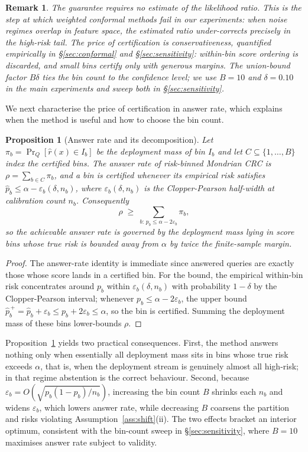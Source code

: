 \documentclass[11pt]{article}
\newtheorem{proposition}{Proposition}
\newtheorem{remark}{Remark}
\begin{document}
\begin{remark}
The guarantee requires no estimate of the likelihood ratio. This is the
step at which weighted conformal methods fail in our experiments: when
noise regimes overlap in feature space, the estimated ratio
under-corrects precisely in the high-risk tail. The price of
certification is conservativeness, quantified empirically in
\S\ref{sec:conformal} and \S\ref{sec:sensitivity}: within-bin score
ordering is discarded, and small bins certify only with generous
margins. The union-bound factor $B\delta$ ties the bin count to the
confidence level; we use $B = 10$ and $\delta = 0.10$ in the main
experiments and sweep both in \S\ref{sec:sensitivity}.
\end{remark}

We next characterise the price of certification in answer rate, which
explains when the method is useful and how to choose the bin count.

\begin{proposition}[Answer rate and its decomposition]\label{prop:eff}
Let $\pi_b = \Pr_Q[\hat r(x) \in I_b]$ be the deployment mass of bin
$I_b$ and let $C \subseteq \{1, \dots, B\}$ index the certified bins.
The answer rate of risk-binned Mondrian CRC is
$\rho = \sum_{b \in C} \pi_b$, and a bin is certified whenever its
empirical risk satisfies
$\widehat p_b \le \alpha - \varepsilon_b(\delta, n_b)$, where
$\varepsilon_b(\delta, n_b)$ is the Clopper-Pearson half-width at
calibration count $n_b$. Consequently
\[
\rho \;\ge\; \sum_{b:\, p_b \le \alpha - 2\varepsilon_b} \pi_b ,
\]
so the achievable answer rate is governed by the deployment mass lying
in score bins whose true risk is bounded away from $\alpha$ by twice
the finite-sample margin.
\end{proposition}

\begin{proof}
The answer-rate identity is immediate since answered queries are exactly
those whose score lands in a certified bin. For the bound, the empirical
within-bin risk concentrates around $p_b$ within
$\varepsilon_b(\delta, n_b)$ with probability $1 - \delta$ by the
Clopper-Pearson interval; whenever $p_b \le \alpha - 2\varepsilon_b$,
the upper bound $\widehat p^{\,+}_b = \widehat p_b + \varepsilon_b
\le p_b + 2\varepsilon_b \le \alpha$, so the bin is certified. Summing
the deployment mass of these bins lower-bounds $\rho$.
\end{proof}

Proposition~\ref{prop:eff} yields two practical consequences. First,
the method answers nothing only when essentially all deployment mass
sits in bins whose true risk exceeds $\alpha$, that is, when the
deployment stream is genuinely almost all high-risk; in that regime
abstention is the correct behaviour. Second, because
$\varepsilon_b = O(\sqrt{p_b(1 - p_b)/n_b})$, increasing the bin count
$B$ shrinks each $n_b$ and widens $\varepsilon_b$, which lowers answer
rate, while decreasing $B$ coarsens the partition and risks violating
Assumption~\ref{ass:shift}(ii). The two effects bracket an interior
optimum, consistent with the bin-count sweep in
\S\ref{sec:sensitivity}, where $B = 10$ maximises answer rate subject
to validity.
\end{document}
